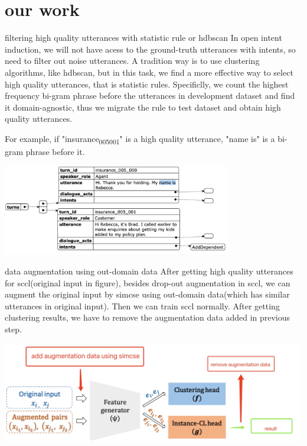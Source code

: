 \documentclass[]{beamer}
\begin{document}
\section{our work}
\label{sec:org26907ee}
\begin{frame}[label={sec:orge47a25d}]{filtering high quality utterances with statistic rule or hdbscan}
In open intent induction, we will not have acess to the ground-truth utterances with intents, so need to filter out noise utterances. A tradition way is to use clustering algorithms, like hdbscan, but in this task, we find a more effective way to select high quality utterances, that is statistic rules. Specificlly, we count the highest frequency bi-gram phrase before the utterances in development dataset and find it domain-agnostic, thus we migrate the rule to test dataset and obtain high quality utterances.

For example, if "insurance\textsubscript{005}\textsubscript{001}" is a high quality utterance, "name is" is a bi-gram phrase before it.

\begin{center}
\includegraphics[width=0.75\textwidth]{../images/20221104-234622_screenshot.png}
\end{center}
\end{frame}

\begin{frame}[label={sec:orga808ad0}]{data augmentation using out-domain data}
After getting high quality utterances for sccl(original input in figure), besides drop-out augmentation in sccl, we can augment the original input by simcse using out-domain data(which has similar utterances in original input). Then we can train sccl normally. After getting clustering results, we have to remove the augmentation data added in previous step.
\begin{center}
\includegraphics[width=.9\linewidth]{../images/20221104-235604_screenshot.png}
\end{center}
\end{frame}
\end{document}
